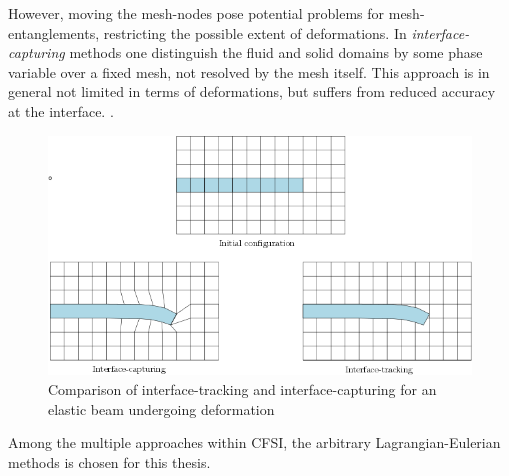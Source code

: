 However, moving the mesh-nodes pose potential problems for mesh-entanglements, restricting the possible extent of deformations.  
In \textit{interface-capturing} methods one distinguish the fluid and solid domains by some phase variable over a fixed mesh, not resolved by the mesh itself. This approach is in general not limited in terms of deformations, but suffers from reduced accuracy at the interface. \cite{Frei2016}. 
\begin{figure}[h!]
  \centering
    \includegraphics[scale=0.5]{./Fig/interface.png}
      \caption{Comparison of interface-tracking and interface-capturing for an elastic beam undergoing deformation}
\end{figure}
Among the multiple approaches within CFSI, the arbitrary Lagrangian-Eulerian methods is chosen for this thesis. 
\newpage
